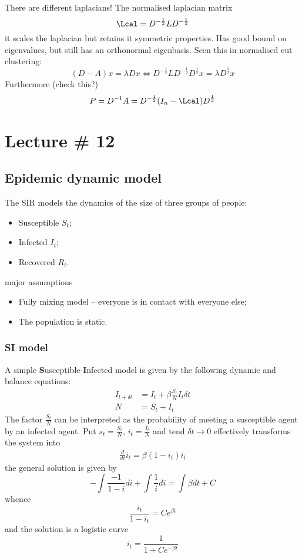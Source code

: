 \documentclass[a4paper]{article}
\begin{document}

There are different laplacians! The normalised laplacian matrix
\[\Lcal = D^{-\frac{1}{2}} L D^{-\frac{1}{2}} \]
it scales the laplacian but retains it symmetric properties. Has good bound on
eigenvalues, but still has an orthonormal eigenbasis. Seen this in normalised
cut clustering:
\[
(D-A) x
= \lambda D x 
\Leftrightarrow
D^{-\frac{1}{2}} L D^{-\frac{1}{2}} D^\frac{1}{2} x
= \lambda D^\frac{1}{2} x
\]
Furthermore (check this?)
\[
P
= D^{-1} A
= D^{-\frac{1}{2}}(I_n - \Lcal)D^\frac{1}{2}
\]



\section{Lecture \# 12} %
\label{sec:lecture_#_12}

\subsection{Epidemic dynamic model} %
\label{sub:epidemic_dynamic_model}

The SIR models the dynamics of the size of three groups of people:\begin{itemize}
	\item Susceptible $S_t$;
	\item Infected $I_t$;
	\item Recovered $R_t$.
\end{itemize}

major assumptions \begin{itemize}
	\item Fully mixing model -- everyone is in contact with everyone else;
	\item The population is static.
\end{itemize}

\subsubsection{SI model} %
\label{ssub:si_model}

A simple \textbf{S}usceptible-\textbf{I}nfected model is given by the following dynamic and balance equations:
\begin{align*}
	I_{t+\delta t} &= I_t + \beta \frac{S_t}{N} I_t \delta t\\
	N &= S_t + I_t
\end{align*}
The factor $\frac{S_t}{N}$ can be interpreted as the probability of meeting a
susceptible agent by an infected agent.
Put $s_t = \frac{S_t}{N}$, $i_t = \frac{I_t}{N}$ and tend $\delta t \to 0$ effectively transforms the system into
\begin{align*}
	\frac{d}{dt}i_t = \beta (1 - i_t) i_t
\end{align*}
the general solution is given by
\[ -\int \frac{-1}{1-i} di + \int \frac{1}{i} di = \int \beta dt + C \]
whence
\[ \frac{i_t}{1-i_t} = Ce^{\beta t} \]
and the solution is a logistic curve
\[i_t = \frac{1}{1+Ce^{-\beta t}} \]
\end{document}
